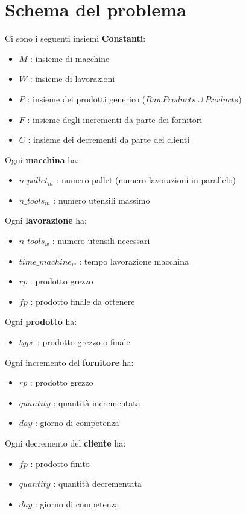 \section{Schema del problema}
Ci sono i seguenti insiemi \textbf{Constanti}:
\begin{itemize}
    \item \(M\) : insieme di macchine
    \item \(W\) : insieme di lavorazioni
    \item \(P\) : insieme dei prodotti generico (\(RawProducts \cup Products\))
    \item \(F\) : insieme degli incrementi da parte dei fornitori
    \item \(C\) : insieme dei decrementi da parte dei clienti
\end{itemize}
Ogni \textbf{macchina} ha:
\begin{itemize}
    \item \(n\_pallet_m\) : numero pallet (numero lavorazioni in parallelo)
    \item \(n\_tools_m\) : numero utensili massimo
\end{itemize}
Ogni \textbf{lavorazione} ha:
\begin{itemize}
    \item \(n\_tools_w\) : numero utensili necessari
    \item \(time\_machine_w\) : tempo lavorazione macchina
    \item \(rp\) : prodotto grezzo
    \item \(fp\) : prodotto finale da ottenere
\end{itemize}
Ogni \textbf{prodotto} ha:
\begin{itemize}
    \item \(type\) : prodotto grezzo o finale
\end{itemize}
Ogni incremento del \textbf{fornitore} ha:
\begin{itemize}
    \item \(rp\) : prodotto grezzo
    \item \(quantity\) : quantità incrementata
    \item \(day\) : giorno di competenza
\end{itemize}
Ogni decremento del \textbf{cliente} ha:
\begin{itemize}
    \item \(fp\) : prodotto finito
    \item \(quantity\) : quantità decrementata
    \item \(day\) : giorno di competenza
\end{itemize}

